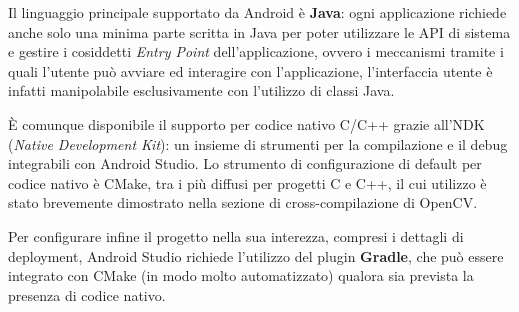 Il linguaggio principale supportato da Android è \textbf{Java}: ogni applicazione richiede anche solo una minima parte scritta 
in Java per poter utilizzare le API di sistema e gestire i cosiddetti \emph{Entry Point} dell'applicazione, ovvero i meccanismi 
tramite i quali l'utente può avviare ed interagire con l'applicazione, l'interfaccia utente è infatti manipolabile esclusivamente
con l'utilizzo di classi Java.

È comunque disponibile il supporto per codice nativo C/C++ grazie all'NDK (\emph{Native Development Kit}): un insieme di strumenti
per la compilazione e il debug integrabili con Android Studio. Lo strumento di configurazione di default per codice nativo è 
CMake, tra i più diffusi per progetti C e C++, il cui utilizzo è stato brevemente dimostrato nella sezione di cross-compilazione 
di OpenCV.

Per configurare infine il progetto nella sua interezza, compresi i dettagli di deployment, Android Studio richiede l'utilizzo 
del plugin \textbf{Gradle}, che può essere integrato con CMake (in modo molto automatizzato) qualora sia prevista la 
presenza di codice nativo.


